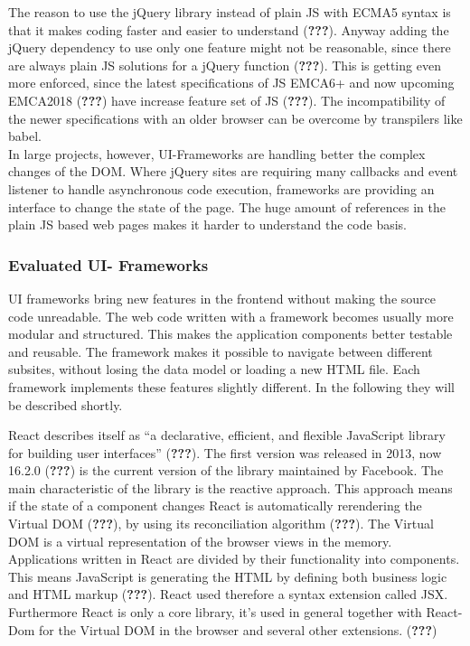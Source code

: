 \documentclass[american,a4paper,oneside,,tablecaptionabove]{scrbook}
\begin{document}
The reason to use the jQuery library instead of plain JS with ECMA5
syntax is that it makes coding faster and easier to understand
({\textbf{???}}). Anyway adding the jQuery dependency to use only one
feature might not be reasonable, since there are always plain JS
solutions for a jQuery function ({\textbf{???}}). This is getting even
more enforced, since the latest specifications of JS EMCA6+ and now
upcoming EMCA2018 ({\textbf{???}}) have increase feature set of JS
({\textbf{???}}). The incompatibility of the newer specifications with
an older browser can be overcome by transpilers like babel.\\
In large projects, however, UI-Frameworks are handling better the
complex changes of the DOM. Where jQuery sites are requiring many
callbacks and event listener to handle asynchronous code execution,
frameworks are providing an interface to change the state of the page.
The huge amount of references in the plain JS based web pages makes it
harder to understand the code basis.

\subsubsection{Evaluated UI- Frameworks}\label{evaluated-ui--frameworks}

UI frameworks bring new features in the frontend without making the
source code unreadable. The web code written with a framework becomes
usually more modular and structured. This makes the application
components better testable and reusable. The framework makes it possible
to navigate between different subsites, without losing the data model or
loading a new HTML file. Each framework implements these features
slightly different. In the following they will be described shortly.

React describes itself as \enquote{a declarative, efficient, and
flexible JavaScript library for building user interfaces}
({\textbf{???}}). The first version was released in 2013, now 16.2.0
({\textbf{???}}) is the current version of the library maintained by
Facebook. The main characteristic of the library is the reactive
approach. This approach means if the state of a component changes React
is automatically rerendering the Virtual DOM ({\textbf{???}}), by using
its reconciliation algorithm ({\textbf{???}}). The Virtual DOM is a
virtual representation of the browser views in the memory. Applications
written in React are divided by their functionality into components.
This means JavaScript is generating the HTML by defining both business
logic and HTML markup ({\textbf{???}}). React used therefore a syntax
extension called JSX. Furthermore React is only a core library, it's
used in general together with React-Dom for the Virtual DOM in the
browser and several other extensions. ({\textbf{???}})
\end{document}
